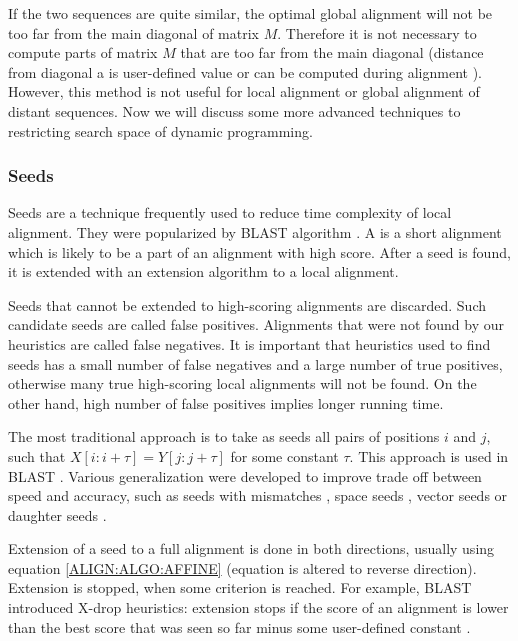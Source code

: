 If the two sequences are quite similar, the optimal global alignment will not
be too far from the main diagonal of matrix $M$. Therefore it is not necessary
to compute parts of matrix $M$ that are too far from the main diagonal
\cite{Chao1992} (distance from diagonal a is user-defined value or can be
computed during alignment \cite{GusfieldBook}).  However, this method is not
useful for local alignment or global alignment of distant sequences. Now we
will discuss some more advanced techniques to restricting search space of
dynamic programming.

\subsubsection{Seeds}

Seeds are a technique frequently  used to reduce time complexity of local
alignment.  They were popularized by BLAST algorithm \cite{Altschul1990}.  A
 is a short alignment which is likely to be a part of an
alignment with high score. After a seed is found, it is extended with an
extension algorithm to a local alignment.

Seeds that cannot be extended to high-scoring alignments are discarded. Such
candidate seeds are called false positives.  Alignments that were not found by
our heuristics are called false negatives.  It is important that heuristics
used to find seeds has a small number of false negatives and a large number of
true positives, otherwise many true high-scoring local alignments will not be
found. On the other hand, high number of false positives implies longer running
time. 


The most traditional approach is to take as seeds all pairs of positions $i$
and $j$, such that $X[i:i+\tau]=Y[j:j+\tau]$ for some
constant $\tau$. This approach is used in BLAST \cite{Altschul1990}.  Various
generalization were developed to improve trade off between
speed and accuracy, such as seeds with mismatches \cite{Kent2002}, space seeds
\cite{Ma2002}, vector seeds \cite{Brejova2005vector} or daughter seeds
\cite{Csuros2005}.

Extension of a seed to a full alignment is done in both directions, usually
using equation \ref{ALIGN:ALGO:AFFINE} (equation is altered to reverse
direction). Extension is stopped, when some criterion is reached. For example,
BLAST introduced X-drop heuristics: extension stops if the score of an alignment
is lower than the best score that was seen so far minus some user-defined
constant \cite{Altschul1997}.

